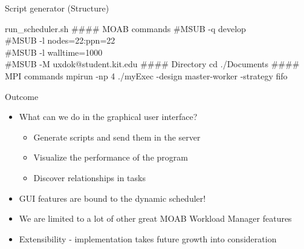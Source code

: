 	\begin{frame}{Script generator (Structure)}
		
		\begin{block}{run\_scheduler.sh}
		        \#\#\#\# MOAB commands
		        \newline
		        \newline
				\#MSUB  -q develop\\
				\#MSUB  -l nodes=22:ppn=22\\
				\#MSUB  -l walltime=1000\\
				\#MSUB  -M uxdok@student.kit.edu
				\newline
				\newline
        				\#\#\#\# Directory
				\newline
				\newline
				cd ./Documents
				\newline
				\newline
        				\#\#\#\# MPI commands
        			\newline
        			\newline
				mpirun -np 4 ./myExec -design master-worker -strategy fifo
			
		\end{block}
	\end{frame}
	
	
\begin{frame}{Outcome}
\begin{itemize}
\item What can we do in the graphical user interface?	
\begin{itemize}
			\pause
			 \item Generate scripts and send them in the server
			 \item Visualize the performance of the program 
			 \item Discover relationships in tasks
\end{itemize}
\pause
\item GUI features are bound to the dynamic scheduler!
\pause
\item  \Frowny{} We are limited to a lot of other great MOAB Workload Manager features
			
\pause
\item \Smiley{} Extensibility - implementation takes future growth into consideration 
	\end{itemize}
		
	\end{frame}
	